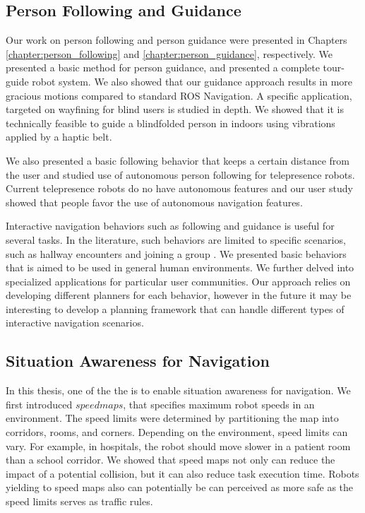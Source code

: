 \documentclass[12pt]{gatech-thesis}
\begin{document}
\subsection{Person Following and Guidance}

Our work on person following and person guidance were presented in Chapters \ref{chapter:person_following} and \ref{chapter:person_guidance}, respectively. We presented a basic method for person guidance, and presented a complete tour-guide robot system. We also showed that our guidance approach results in more gracious motions compared to standard ROS Navigation. A specific application, targeted on wayfining for blind users is studied in depth. We showed that it is technically feasible to guide a blindfolded person in indoors using vibrations applied by a haptic belt.

We also presented a basic following behavior that keeps a certain distance from the user and studied use of autonomous person following for telepresence robots. Current telepresence robots do no have autonomous features and our user study showed that people favor the use of autonomous navigation features.

Interactive navigation behaviors such as following and guidance is useful for several tasks. In the literature, such behaviors are limited to specific scenarios, such as hallway encounters \cite{pacchierotti2005human} and joining a group \cite{althaus2004navigation}. We presented basic behaviors that is aimed to be used in general human environments. We further delved into specialized applications for particular user communities. Our approach relies on developing different planners for each behavior, however in the future it may be interesting to develop a planning framework that can handle different types of interactive navigation scenarios.

\subsection{Situation Awareness for Navigation}

In this thesis, one of the the is to enable situation awareness for navigation. We first introduced $speed maps$, that specifies maximum robot speeds in an environment. The speed limits were determined by partitioning the map into corridors, rooms, and corners. Depending on the environment, speed limits can vary. For example, in hospitals, the robot should move slower in a patient room than a school corridor. We showed that speed maps not only can reduce the impact of a potential collision, but it can also reduce task execution time. Robots yielding to speed maps also can potentially be can perceived as more safe as the speed limits serves as traffic rules.
\end{document}
